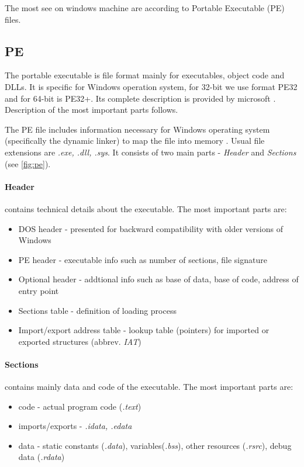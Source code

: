 The most see on windows machine are according to \cite{AVATLASM39:online} Portable Executable (PE) files.

\subsection{PE}
The portable executable is file format mainly for executables, object code and DLLs. It is specific for Windows operation system, for 32-bit we use format PE32 and for 64-bit is PE32+. Its complete description is provided by microsoft \cite{PEFormat89:online}. Description of the most important parts follows.

The PE file includes information necessary for Windows operating system (specifically the dynamic linker) to map the file into memory \cite{Gibert2020}. Usual file extensions are \emph{.exe, .dll, .sys}. It consists of two main parts - \emph{Header} and \emph{Sections} (see \ref{fig:pe}). 

\paragraph{Header} contains technical details about the executable. The most important parts are:
\begin{itemize}
  \item DOS header - presented for backward compatibility with older versions of Windows
  \item PE header - executable info such as number of sections, file signature
  \item Optional header - addtional info such as base of data, base of code, address of entry point
  \item Sections table - definition of loading process
  \item Import/export address table - lookup table (pointers) for imported or exported structures (abbrev. \emph{IAT})
\end{itemize}

\paragraph{Sections} contains mainly data and code of the executable. The most important parts are:
\begin{itemize}
  \item code - actual program code (\emph{.text})
  \item imports/exports - \emph{.idata, .edata}
  \item data - static constants (\emph{.data}), variables(\emph{.bss}), other resources (\emph{.rsrc}), debug data (\emph{.rdata})
\end{itemize}

